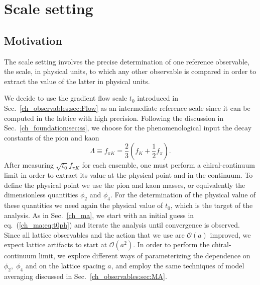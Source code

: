 \chapter{Scale setting}


\label{ch_ss}


\section{Motivation}
\label{ch_ss:sec:introduction}

The scale setting involves the precise determination of one reference observable, the scale, in physical units, to which any other observable is compared in order to extract the value of the latter in physical units. 

We decide to use the gradient flow scale $t_0$ introduced in Sec.~\ref{ch_observables:sec:Flow} as an intermediate reference scale since it can be computed in the lattice with high precision. Following the discussion in Sec.~\ref{ch_foundation:sec:ss}, we choose for the phenomenological input the decay constants of the pion and kaon
\begin{equation}
\label{ch_ss:eq:fpik}
\Lambda\equiv f_{\pi K}=\frac{2}{3}\left(f_K+\frac{1}{2}f_{\pi}\right).
\end{equation}
After measuring $\sqrt{t_0}f_{\pi K}$ for each ensemble, one must perform a chiral-continuum limit in order to extract its value at the physical point and in the continuum. To define the physical point we use the pion and kaon masses, or equivalently the dimensionless quantities $\phi_2$ and $\phi_4$. For the determination of the physical value of these quantities we need again the physical value of $t_0$, which is the target of the analysis. As in Sec.~\ref{ch_ma}, we start with an initial guess in eq.~(\ref{ch_ma:eq:t0ph}) and iterate the analysis until convergence is observed. Since all lattice observables and the action that we use are $\mathcal{O}(a)$ improved, we expect lattice artifacts to start at $\mathcal{O}(a^2)$. In order to perform the chiral-continuum limit, we explore different ways of parameterizing the dependence on $\phi_2,\;\phi_4$ and on the lattice spacing $a$, and employ the same techniques of model averaging discussed in Sec.~\ref{ch_observables:sec:MA}.

